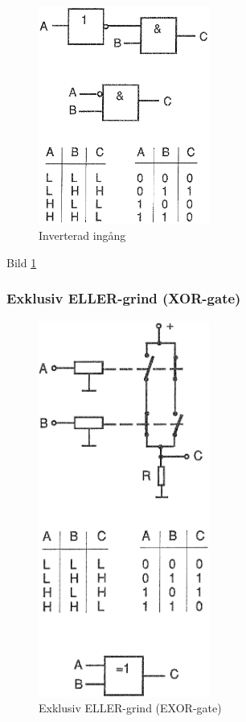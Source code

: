 \begin{figure}
\includegraphics[width=0.5\textwidth]{images/cropped_pdfs/bild_2_2-41.pdf}
\caption{Inverterad ingång}
\label{fig:BildII2-41}
\end{figure}

Bild \ref{fig:BildII2-41}

\subsubsection{Exklusiv ELLER-grind (XOR-gate)}

\begin{figure}
\includegraphics[width=0.5\textwidth]{images/cropped_pdfs/bild_2_2-42.pdf}
\caption{Exklusiv ELLER-grind (EXOR-gate)}
\label{fig:BildII2-42}
\end{figure}

